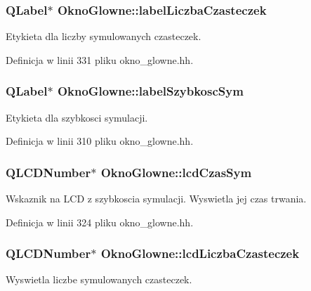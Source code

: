 \hypertarget{class_okno_glowne_ab01460f1222d0ec2892abf21efb23078}{
\subsubsection[{label\-Liczba\-Czasteczek}]{\setlength{\rightskip}{0pt plus 5cm}Q\-Label$\ast$ Okno\-Glowne\-::label\-Liczba\-Czasteczek\hspace{0.3cm}{\ttfamily [private]}}}\label{class_okno_glowne_ab01460f1222d0ec2892abf21efb23078}
Etykieta dla liczby symulowanych czasteczek. 

Definicja w linii 331 pliku okno\-\_\-glowne.\-hh.

\hypertarget{class_okno_glowne_ad7b0708ffdf61f3bef1349cc353a6c4e}{
\subsubsection[{label\-Szybkosc\-Sym}]{\setlength{\rightskip}{0pt plus 5cm}Q\-Label$\ast$ Okno\-Glowne\-::label\-Szybkosc\-Sym\hspace{0.3cm}{\ttfamily [private]}}}\label{class_okno_glowne_ad7b0708ffdf61f3bef1349cc353a6c4e}
Etykieta dla szybkosci symulacji. 

Definicja w linii 310 pliku okno\-\_\-glowne.\-hh.

\hypertarget{class_okno_glowne_ab34fefe738e38b1b0d4ce764481cc0c6}{
\subsubsection[{lcd\-Czas\-Sym}]{\setlength{\rightskip}{0pt plus 5cm}Q\-L\-C\-D\-Number$\ast$ Okno\-Glowne\-::lcd\-Czas\-Sym\hspace{0.3cm}{\ttfamily [private]}}}\label{class_okno_glowne_ab34fefe738e38b1b0d4ce764481cc0c6}
Wskaznik na L\-C\-D z szybkoscia symulacji. Wyswietla jej czas trwania. 

Definicja w linii 324 pliku okno\-\_\-glowne.\-hh.

\hypertarget{class_okno_glowne_adbdd9fc009725804e015d267dc8375dc}{
\subsubsection[{lcd\-Liczba\-Czasteczek}]{\setlength{\rightskip}{0pt plus 5cm}Q\-L\-C\-D\-Number$\ast$ Okno\-Glowne\-::lcd\-Liczba\-Czasteczek\hspace{0.3cm}{\ttfamily [private]}}}\label{class_okno_glowne_adbdd9fc009725804e015d267dc8375dc}
Wyswietla liczbe symulowanych czasteczek. 

